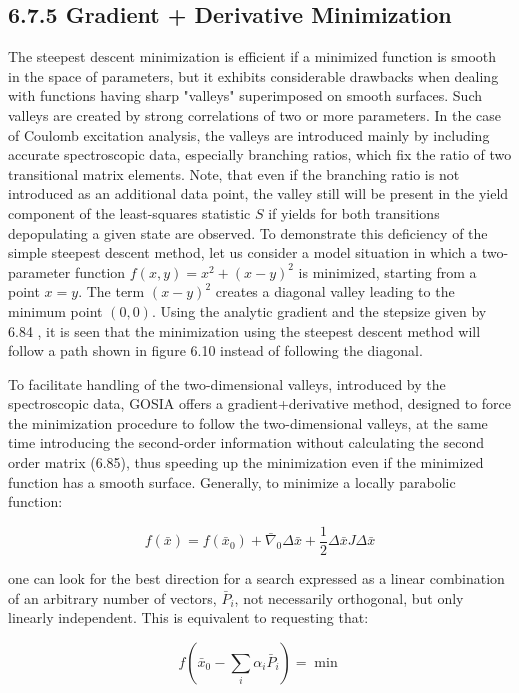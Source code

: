 \documentclass[10pt]{article}
\begin{document}
\subsection*{6.7.5 Gradient + Derivative Minimization}
The steepest descent minimization is efficient if a minimized function is smooth in the space of parameters, but it exhibits considerable drawbacks when dealing with functions having sharp "valleys" superimposed on smooth surfaces. Such valleys are created by strong correlations of two or more parameters. In the case of Coulomb excitation analysis, the valleys are introduced mainly by including accurate spectroscopic data, especially branching ratios, which fix the ratio of two transitional matrix elements. Note, that even if the branching ratio is not introduced as an additional data point, the valley still will be present in the yield component of the least-squares statistic $S$ if yields for both transitions depopulating a given state are observed. To demonstrate this deficiency of the simple steepest descent method, let us consider a model situation in which a two-parameter function $f(x, y)=x^{2}+(x-y)^{2}$ is minimized, starting from a point $x=y$. The term $(x-y)^{2}$ creates a diagonal valley leading to the minimum point $(0,0)$. Using the analytic gradient and the stepsize given by 6.84 , it is seen that the minimization using the steepest descent method will follow a path shown in figure 6.10 instead of following the diagonal.

To facilitate handling of the two-dimensional valleys, introduced by the spectroscopic data, GOSIA offers a gradient+derivative method, designed to force the minimization procedure to follow the two-dimensional valleys, at the same time introducing the second-order information without calculating the second order matrix (6.85), thus speeding up the minimization even if the minimized function has a smooth surface. Generally, to minimize a locally parabolic function:


\begin{equation*}
f(\bar{x})=f\left(\bar{x}_{0}\right)+\bar{\nabla}_{0} \Delta \bar{x}+\frac{1}{2} \Delta \bar{x} J \Delta \bar{x} \tag{6.93}
\end{equation*}


one can look for the best direction for a search expressed as a linear combination of an arbitrary number of vectors, $\bar{P}_{i}$, not necessarily orthogonal, but only linearly independent. This is equivalent to requesting that:


\begin{equation*}
f\left(\bar{x}_{0}-\sum_{i} \alpha_{i} \bar{P}_{i}\right)=\min \tag{6.94}
\end{equation*}
\end{document}
